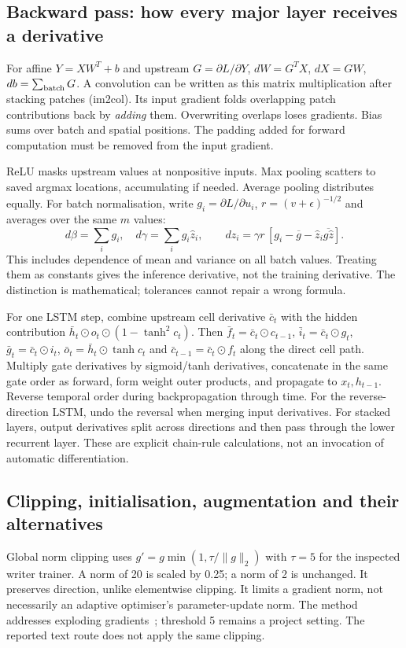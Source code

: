 \subsection{Backward pass: how every major layer receives a derivative}
For affine $Y=XW^T+b$ and upstream $G=\partial L/\partial Y$,
$dW=G^TX$, $dX=GW$, $db=\sum_{\rm batch}G$. A convolution can be
written as this matrix multiplication after stacking patches (im2col).
Its input gradient folds overlapping patch contributions back by \emph{adding}
them. Overwriting overlaps loses gradients. Bias sums over batch and spatial
positions. The padding added for forward computation must be removed from
the input gradient.

ReLU masks upstream values at nonpositive inputs. Max pooling scatters to
saved argmax locations, accumulating if needed. Average pooling distributes
equally. For batch normalisation, write $g_i=\partial L/\partial u_i$,
$r=(v+\epsilon)^{-1/2}$ and averages over the same $m$ values:
\[
d\beta=\sum_i g_i,\quad d\gamma=\sum_i g_i\hat z_i,\qquad
dz_i=\gamma r\,[g_i-\overline g-\hat z_i\overline{g\hat z}].
\]
This includes dependence of mean and variance on all batch values. Treating
them as constants gives the inference derivative, not the training derivative.
The distinction is mathematical; tolerances cannot repair a wrong formula.

For one LSTM step, combine upstream cell derivative $\bar c_t$ with the
hidden contribution $\bar h_t\odot o_t\odot(1-\tanh^2c_t)$.
Then $\bar f_t=\bar c_t\odot c_{t-1}$,
$\bar i_t=\bar c_t\odot g_t$,
$\bar g_t=\bar c_t\odot i_t$,
$\bar o_t=\bar h_t\odot\tanh c_t$ and
$\bar c_{t-1}=\bar c_t\odot f_t$ along the direct cell path.
Multiply gate derivatives by sigmoid/tanh derivatives, concatenate in the
same gate order as forward, form weight outer products, and propagate to
$x_t,h_{t-1}$. Reverse temporal order during backpropagation through time.
For the reverse-direction LSTM, undo the reversal when merging input
derivatives. For stacked layers, output derivatives split across directions
and then pass through the lower recurrent layer. These are explicit
chain-rule calculations, not an invocation of automatic differentiation.

\subsection{Clipping, initialisation, augmentation and their alternatives}
Global norm clipping uses
$g'=g\min(1,\tau/\|g\|_2)$ with $\tau=5$ for the inspected writer trainer.
A norm of 20 is scaled by 0.25; a norm of 2 is unchanged. It preserves
direction, unlike elementwise clipping. It limits a gradient norm, not
necessarily an adaptive optimiser's parameter-update norm. The method
addresses exploding gradients~\cite{pascanu2013}; threshold 5 remains a
project setting. The reported text route does not apply the same clipping.

